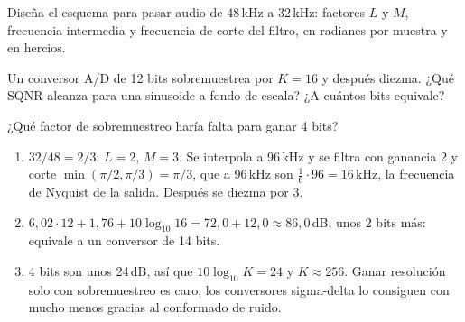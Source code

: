 \documentclass[11pt,a4paper]{scrartcl}
\begin{document}
\begin{ejercicio}
  \begin{incisos}[1]
    \item Diseña el esquema para pasar audio de 48\,kHz a 32\,kHz: factores $L$ y $M$, frecuencia intermedia y frecuencia de corte del filtro, en radianes por muestra y en hercios.
    \item Un conversor A/D de 12 bits sobremuestrea por $K=16$ y después diezma. ¿Qué SQNR alcanza para una sinusoide a fondo de escala? ¿A cuántos bits equivale?
    \item ¿Qué factor de sobremuestreo haría falta para ganar 4 bits?
  \end{incisos}
\end{ejercicio}
\begin{solucion}
  \begin{enumerate}[label=\alph*)]
    \item $32/48=2/3$: $L=2$, $M=3$. Se interpola a 96\,kHz y se filtra con ganancia 2 y corte $\min(\pi/2,\pi/3)=\pi/3$, que a 96\,kHz son $\frac{1}{6}\cdot96=16$\,kHz, la frecuencia de Nyquist de la salida. Después se diezma por 3.
    \item $6{,}02\cdot12+1{,}76+10\log_{10}16=72{,}0+12{,}0\approx86{,}0$\,dB, unos 2 bits más: equivale a un conversor de 14 bits.
    \item 4 bits son unos 24\,dB, así que $10\log_{10}K=24$ y $K\approx256$. Ganar resolución solo con sobremuestreo es caro; los conversores sigma-delta lo consiguen con mucho menos gracias al conformado de ruido.
  \end{enumerate}
\end{solucion}
\end{document}

